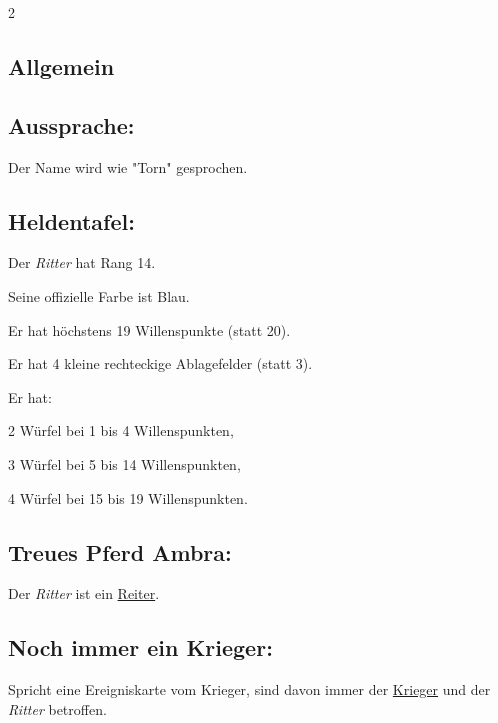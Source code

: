 \documentclass[10pt, a4paper, oneside]{book}
\newcommand{\fan}[1]{\textit{#1}}
\begin{document}
\begin{multicols*}{2}\raggedcolumns




\begin{nobgcolor}

\section{Allgemein}


\subsection{Aussprache:}


Der Name wird wie "Torn" gesprochen.
\supercite{33469}






\subsection{Heldentafel:}

Der \fan{Ritter} hat Rang 14.

Seine offizielle Farbe ist Blau.

Er hat höchstens 19 Willenspunkte (statt 20).

Er hat 4 kleine rechteckige Ablagefelder (statt 3).

Er hat:

\bullet{} 2 Würfel bei 1 bis 4 Willenspunkten,

\bullet{} 3 Würfel bei 5 bis 14 Willenspunkten,

\bullet{} 4 Würfel bei 15 bis 19 Willenspunkten.






\subsection{Treues Pferd Ambra:}

Der \fan{Ritter} ist ein \hyperref[Reiter]{Reiter}.





\subsection{Noch immer ein Krieger:}

Spricht eine Ereigniskarte vom Krieger, sind davon immer der \hyperref[Krieger]{Krieger} und der \fan{Ritter} betroffen.


\end{nobgcolor}
\end{multicols*}
\end{document}
